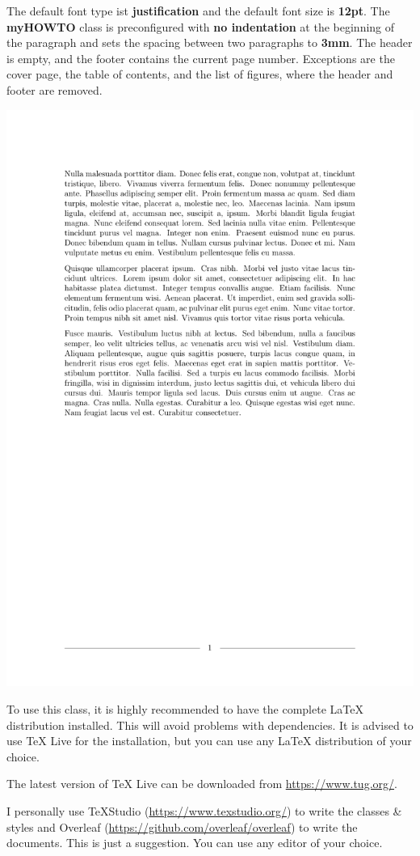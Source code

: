 The default font type ist \textbf{justification} and the default font size is \textbf{12pt}. The \textbf{myHOWTO} class is preconfigured with \textbf{no indentation} at the beginning of the paragraph and sets the spacing between two paragraphs to \textbf{3mm}. The header is empty, and the footer contains the current page number. Exceptions are the cover page, the table of contents, and the list of figures, where the header and footer are removed.

\qquad
\begin{myFIG}{}
	\includegraphics[page=1,scale=0.2]{examples/zz_bsp_file_parSkip.pdf}
\end{myFIG}

To use this class, it is highly recommended to have the complete \LaTeX{} distribution installed. This will avoid problems with dependencies. It is advised to use \TeX{} Live for the installation, but you can use any \LaTeX{} distribution of your choice.

The latest version of \TeX{} Live can be downloaded from \url{https://www.tug.org/}.

I personally use \TeX Studio (\url{https://www.texstudio.org/}) to write the classes \& styles and Overleaf (\url{https://github.com/overleaf/overleaf}) to write the documents. This is just a suggestion. You can use any editor of your choice.